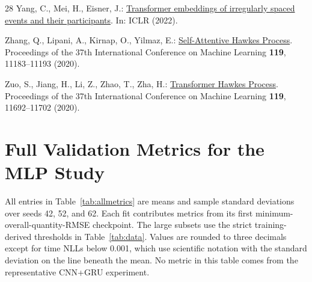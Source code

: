 \documentclass[runningheads]{llncs}
\begin{document}
\begin{thebibliography}{28}
Yang, C., Mei, H., Eisner, J.:
\href{https://www.cs.jhu.edu/~jason/papers/yang+al.iclr22.pdf}{Transformer embeddings of irregularly spaced events and their participants}. In: ICLR (2022).

Zhang, Q., Lipani, A., Kirnap, O., Yilmaz, E.: \href{https://proceedings.mlr.press/v119/zhang20q.html}{Self-Attentive Hawkes Process}. Proceedings of the 37th International Conference on Machine Learning \textbf{119}, 11183--11193 (2020).

Zuo, S., Jiang, H., Li, Z., Zhao, T., Zha, H.: \href{https://proceedings.mlr.press/v119/zuo20a.html}{Transformer Hawkes Process}. Proceedings of the 37th International Conference on Machine Learning \textbf{119}, 11692--11702 (2020).
\end{thebibliography}

\clearpage
\appendix
\renewcommand{\theHsection}{\Alph{section}}
\section{Full Validation Metrics for the MLP Study}
\label{app:metrics}
All entries in Table~\ref{tab:allmetrics} are means and sample standard deviations over seeds 42, 52, and 62. Each fit contributes metrics from its first minimum-overall-quantity-RMSE checkpoint. The large subsets use the strict training-derived thresholds in Table~\ref{tab:data}. Values are rounded to three decimals except for time NLLs below 0.001, which use scientific notation with the standard deviation on the line beneath the mean. No metric in this table comes from the representative CNN+GRU experiment.
\end{document}
